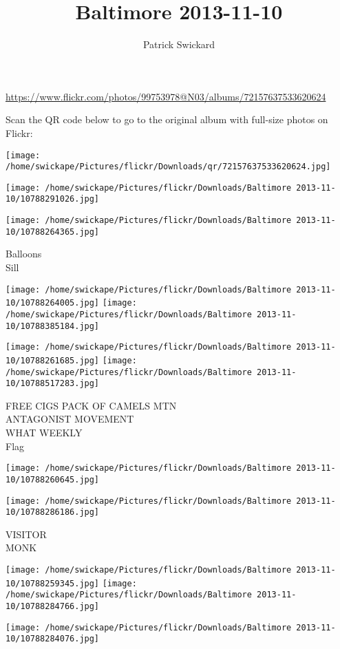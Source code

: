 \documentclass[10pt,letterpaper]{article}
\title{Baltimore 2013-11-10}
\author{Patrick Swickard}
\date{}
\begin{document}
\maketitle

\url{https://www.flickr.com/photos/99753978@N03/albums/72157637533620624}

Scan the QR code below to go to the original album with full-size photos on Flickr:

\texttt{[image: /home/swickape/Pictures/flickr/Downloads/qr/72157637533620624.jpg]}
\pagebreak

\texttt{[image: /home/swickape/Pictures/flickr/Downloads/Baltimore 2013-11-10/10788291026.jpg]}

\vspace{0.25in}
\texttt{[image: /home/swickape/Pictures/flickr/Downloads/Baltimore 2013-11-10/10788264365.jpg]}

Balloons\\
Sill
\pagebreak

\texttt{[image: /home/swickape/Pictures/flickr/Downloads/Baltimore 2013-11-10/10788264005.jpg]}
\texttt{[image: /home/swickape/Pictures/flickr/Downloads/Baltimore 2013-11-10/10788385184.jpg]}

\texttt{[image: /home/swickape/Pictures/flickr/Downloads/Baltimore 2013-11-10/10788261685.jpg]}
\texttt{[image: /home/swickape/Pictures/flickr/Downloads/Baltimore 2013-11-10/10788517283.jpg]}

FREE CIGS PACK OF CAMELS MTN\\
ANTAGONIST MOVEMENT\\
WHAT WEEKLY\\
Flag
\pagebreak

\texttt{[image: /home/swickape/Pictures/flickr/Downloads/Baltimore 2013-11-10/10788260645.jpg]}

\vspace{0.25in}
\texttt{[image: /home/swickape/Pictures/flickr/Downloads/Baltimore 2013-11-10/10788286186.jpg]}

VISITOR\\
MONK
\pagebreak

\texttt{[image: /home/swickape/Pictures/flickr/Downloads/Baltimore 2013-11-10/10788259345.jpg]}
\texttt{[image: /home/swickape/Pictures/flickr/Downloads/Baltimore 2013-11-10/10788284766.jpg]}

\vspace{0.25in}
\texttt{[image: /home/swickape/Pictures/flickr/Downloads/Baltimore 2013-11-10/10788284076.jpg]}
\end{document}
